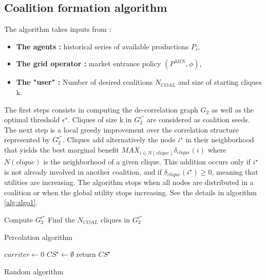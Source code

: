 \documentclass[conference]{IEEEtran}
\begin{document}
\subsection{Coalition formation algorithm}

The algorithm takes inputs from :
\begin{itemize}
	\item \textbf{The agents :} historical series of available productions $P_{i}$, 
	\item \textbf{The grid operator :} market entrance policy $ (P^{MIN},\phi) $,
	\item \textbf{The "user" :} Number of desired coalitions $ N_{COAL} $ and size of starting cliques k.
\end{itemize} 
The first steps consists in computing the de-correlation graph $ G_{2} $ as well as the optimal threshold $ \epsilon^{\star} $. Cliques of size k in $ G_{2}^{\epsilon^{\star}} $ are considered as coalition seeds. The next step is a local greedy improvement over the correlation structure represented by  $ G_{2}^{\epsilon^{\star}} $. Cliques add alternatively the node $ i^{\star} $ in their neighborhood that yields the best marginal benefit $ MAX_{ i \in N(clique) } \delta_{clique}(i) $ where $ N(clique) $ is the neighborhood of a given clique. This addition occurs only if $ i^{\star} $ is not already involved in another coalition, and if $ \delta_{clique}(i^{\star}) \geq 0 $, meaning that utilities are increasing. The algorithm stops when all nodes are distributed in a coalition or when the global utility stops increasing. See the details in algorithm \ref{alg:algo1}.

\begin{algorithm}
 Compute $ G_{2}^{\epsilon^{\star}} $ \;
 Find the $ N_{COAL} $ cliques in $ G_{2}^{\epsilon^{\star}} $\;
 \caption{Percolation algorithm}
 \label{alg:algo1}
\end{algorithm}

\begin{algorithm}
 $ curriter \leftarrow 0 $ \;
 $ CS^{\star} \leftarrow \emptyset $\;
  return $ CS^{\star} $
 \caption{Random algorithm}
 \label{alg:algo2}
\end{algorithm}
\end{document}
